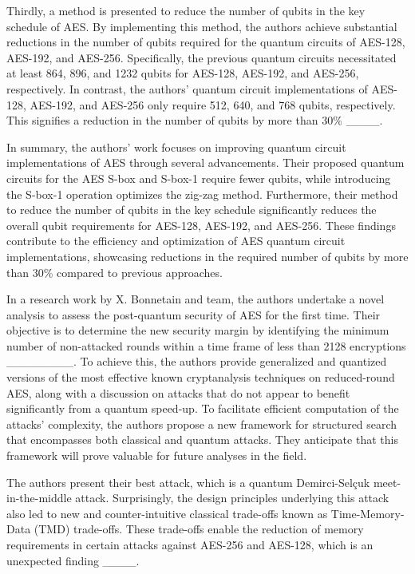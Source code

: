 Thirdly, a method is presented to reduce the number of qubits in the key schedule of AES. By implementing this method, the authors achieve substantial reductions in the number of qubits required for the quantum circuits of AES-128, AES-192, and AES-256. Specifically, the previous quantum circuits necessitated at least 864, 896, and 1232 qubits for AES-128, AES-192, and AES-256, respectively. In contrast, the authors' quantum circuit implementations of AES-128, AES-192, and AES-256 only require 512, 640, and 768 qubits, respectively. This signifies a reduction in the number of qubits by more than 30\% ____. 


In summary, the authors' work focuses on improving quantum circuit implementations of AES through several advancements. Their proposed quantum circuits for the AES S-box and S-box-1 require fewer qubits, while introducing the S-box-1 operation optimizes the zig-zag method. Furthermore, their method to reduce the number of qubits in the key schedule significantly reduces the overall qubit requirements for AES-128, AES-192, and AES-256. These findings contribute to the efficiency and optimization of AES quantum circuit implementations, showcasing reductions in the required number of qubits by more than 30\% compared to previous approaches. 

 
In a research work by X. Bonnetain and team, the authors undertake a novel analysis to assess the post-quantum security of AES for the first time. Their objective is to determine the new security margin by identifying the minimum number of non-attacked rounds within a time frame of less than 2128 encryptions ________. To achieve this, the authors provide generalized and quantized versions of the most effective known cryptanalysis techniques on reduced-round AES, along with a discussion on attacks that do not appear to benefit significantly from a quantum speed-up. To facilitate efficient computation of the attacks' complexity, the authors propose a new framework for structured search that encompasses both classical and quantum attacks. They anticipate that this framework will prove valuable for future analyses in the field. 


The authors present their best attack, which is a quantum Demirci-Selçuk meet-in-the-middle attack. Surprisingly, the design principles underlying this attack also led to new and counter-intuitive classical trade-offs known as Time-Memory-Data (TMD) trade-offs. These trade-offs enable the reduction of memory requirements in certain attacks against AES-256 and AES-128, which is an unexpected finding ____.